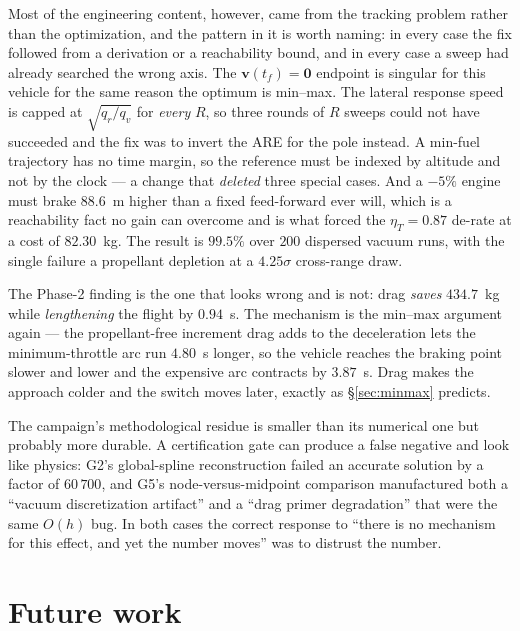 \documentclass[11pt]{article}
\newcommand{\vvec}{\mathbf{v}}
\newcommand{\etaT}{\eta_T}
\begin{document}
Most of the engineering content, however, came from the tracking problem
rather than the optimization, and the pattern in it is worth naming: in
every case the fix followed from a derivation or a reachability bound, and
in every case a sweep had already searched the wrong axis. The
$\vvec(t_f) = \mathbf{0}$ endpoint is singular for this vehicle for the
same reason the optimum is min--max. The lateral response speed is capped
at $\sqrt{q_r/q_v}$ for \emph{every} $R$, so three rounds of $R$ sweeps
could not have succeeded and the fix was to invert the ARE for the pole
instead. A min-fuel trajectory has no time margin, so the reference must be
indexed by altitude and not by the clock --- a change that \emph{deleted}
three special cases. And a $-5\%$ engine must brake $88.6$~m higher than a
fixed feed-forward ever will, which is a reachability fact no gain can
overcome and is what forced the $\etaT = 0.87$ de-rate at a cost of
$82.30$~kg. The result is $99.5\%$ over $200$ dispersed vacuum runs, with
the single failure a propellant depletion at a $4.25\sigma$ cross-range
draw.

The Phase-2 finding is the one that looks wrong and is not: drag
\emph{saves} $434.7$~kg while \emph{lengthening} the flight by $0.94$~s.
The mechanism is the min--max argument again --- the propellant-free
increment drag adds to the deceleration lets the minimum-throttle arc run
$4.80$~s longer, so the vehicle reaches the braking point slower and lower
and the expensive arc contracts by $3.87$~s. Drag makes the approach
colder and the switch moves later, exactly as \S\ref{sec:minmax} predicts.

The campaign's methodological residue is smaller than its numerical one but
probably more durable. A certification gate can produce a false negative
and look like physics: G2's global-spline reconstruction failed an accurate
solution by a factor of $60\,700$, and G5's node-versus-midpoint comparison
manufactured both a ``vacuum discretization artifact'' and a ``drag primer
degradation'' that were the same $O(h)$ bug. In both cases the correct
response to ``there is no mechanism for this effect, and yet the number
moves'' was to distrust the number.

\section{Future work}
\label{sec:future}
\end{document}
